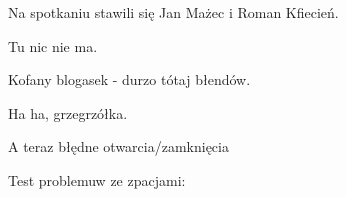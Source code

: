 \documentclass{article}
\begin{document}
Na spotkaniu stawili się Jan Mażec i Roman Kfiecień. %

Tu nic nie ma.

Kofany blogasek - durzo tótaj błendów.

Ha ha, grzegrzółka.

A teraz błędne otwarcia/zamknięcia



Test problemuw ze zpacjami: %
\end{document}
